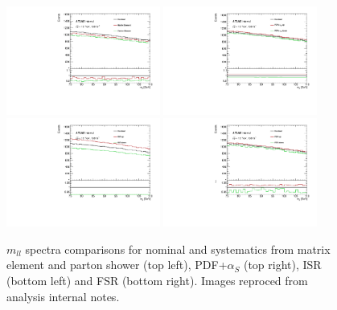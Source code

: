 \begin{figure}[htbp]
  \centering
  \includegraphics[width=0.45\textwidth]{figures/appendix/ZHFSys/ttbar_alter.pdf}
  \includegraphics[width=0.45\textwidth]{figures/appendix/ZHFSys/ttbar_pdf.pdf} \\
  \includegraphics[width=0.45\textwidth]{figures/appendix/ZHFSys/ttbar_ISR.pdf}
  \includegraphics[width=0.45\textwidth]{figures/appendix/ZHFSys/ttbar_FSR.pdf} \\
  \caption{$m_{ll}$ spectra comparisons for nominal and systematics from matrix element and parton
  shower (top left), PDF+$\alpha_{S}$ (top right), ISR (bottom left) and FSR (bottom right).
  Images reproced from analysis internal notes. 
  }
  \label{fig:append:ZHFttbar}
\end{figure}



